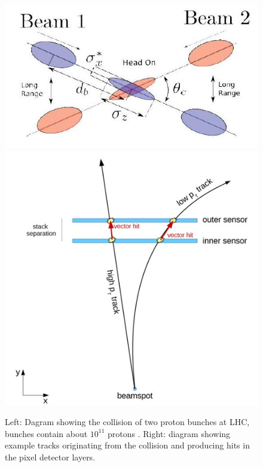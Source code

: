 \documentclass[final,12p]{article}
\begin{document}
\begin{figure}[H]
  \centering
  \includegraphics[width=0.48\columnwidth]{./bunchcrossing.jpg}
  \includegraphics[width=0.48\columnwidth]{./vectorhit1.jpg}
  \caption{
    Left: Dagram showing the collision of two proton bunches at LHC, bunches contain about $10^{11}$ protons  \cite{deMaria:2008zzb}.
    Right: diagram showing example tracks originating from the collision and producing hits in the pixel detector layers.
  }
  \label{fig:bunchcrossing}
\end{figure}
\end{document}
